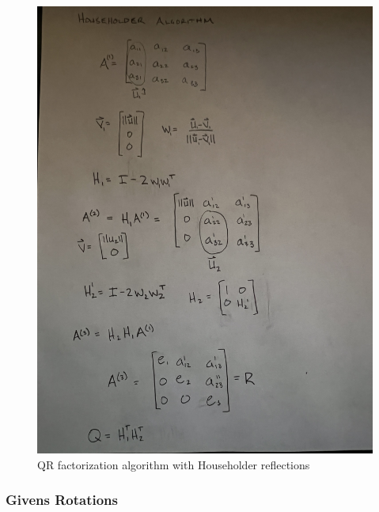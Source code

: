 \documentclass{article}
\begin{document}
\pagebreak
\begin{figure}[h]
\centering
\includegraphics[width=140mm, angle=-90]{Householder3}
\caption{QR factorization algorithm with Householder reflections}
\end{figure}

\subsubsection{Givens Rotations}
\end{document}

